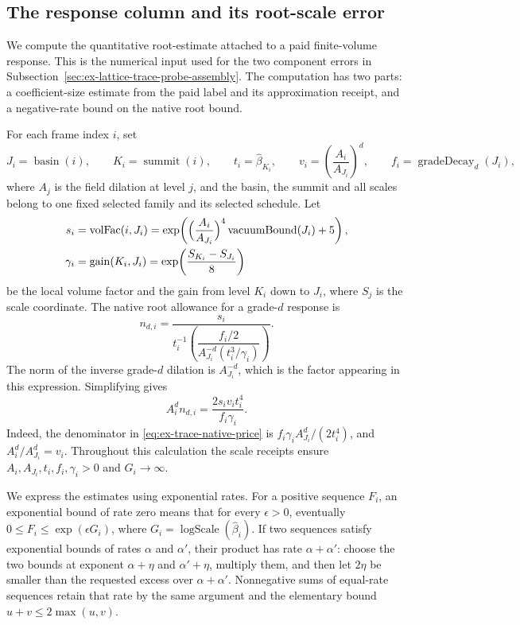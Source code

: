 \subsection{The response column and its root-scale error}
\label{sec:ex-lattice-trace-bill-prices}

We compute the quantitative root-estimate attached to a paid finite-volume
response. This is the numerical input used for the two component errors in
Subsection~\ref{sec:ex-lattice-trace-probe-assembly}. The computation has two
parts: a coefficient-size estimate from the paid label and its approximation
receipt, and a negative-rate bound on the native root bound.

For each frame index $i$, set
\[
 J_i=\operatorname{basin}(i),\qquad K_i=\operatorname{summit}(i),
 \qquad t_i=\widehat\beta_{K_i},\qquad
 v_i=\left(\frac{A_i}{A_{J_i}}\right)^d,
 \qquad f_i=\operatorname{gradeDecay}_d(J_i),
\]
where $A_j$ is the field dilation at level $j$, and the basin, the summit
and all scales belong to one fixed selected family and its selected
schedule. Let
\[\begin{aligned}
 s_i&=\operatorname{volFac}(i,J_i)
    =\exp\!\left(\Bigl(\frac{A_i}{A_{J_i}}\Bigr)^{4}
        \operatorname{vacuumBound}(J_i)+5\right),
 \\
 \gamma_i&=\operatorname{gain}(K_i,J_i)
    =\exp\!\left(\frac{S_{K_i}-S_{J_i}}{8}\right)
\end{aligned}\]
be the local volume factor and the gain from level $K_i$ down to $J_i$,
where $S_j$ is the scale coordinate. The
native root allowance for a grade-$d$ response is
\begin{equation}
 n_{d,i}=\frac{s_i}{t_i^{-1}\left(
     \dfrac{f_i/2}{A_{J_i}^{-d}(t_i^3/\gamma_i)}\right)}.
 \label{eq:ex-trace-native-price}
\end{equation}
The norm of the inverse grade-$d$ dilation is $A_{J_i}^{-d}$, which is the
factor appearing in this expression. Simplifying gives
\begin{equation}
 A_i^d n_{d,i}
   =\frac{2s_i v_i t_i^4}{f_i\gamma_i}.
 \label{eq:ex-trace-priced-native}
\end{equation}
Indeed, the denominator in \eqref{eq:ex-trace-native-price} is
$f_i\gamma_i A_{J_i}^d/(2t_i^4)$, and $A_i^d/A_{J_i}^d=v_i$.
Throughout this calculation the scale receipts ensure
$A_i,A_{J_i},t_i,f_i,\gamma_i>0$ and $G_i\to\infty$.

We express the estimates using exponential rates. For a positive sequence
$F_i$, an exponential bound of rate zero means that for every $\epsilon>0$, eventually
$0\leq F_i\leq\exp(\epsilon G_i)$, where
$G_i=\operatorname{logScale}(\widehat\beta_i)$. If two sequences satisfy exponential bounds
of rates $\alpha$ and $\alpha'$, their product has rate $\alpha+\alpha'$:
choose the two bounds at exponent $\alpha+\eta$ and
$\alpha'+\eta$, multiply them, and then let $2\eta$ be smaller than the
requested excess over $\alpha+\alpha'$. Nonnegative sums of equal-rate
sequences retain that rate by the same argument and the elementary bound
$u+v\leq2\max(u,v)$.

